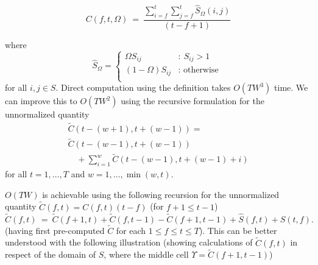 \documentclass[twocolumn]{article}
\begin{document}
	\begin{dmath*}
		C(f,t, \Omega) ~=~ \frac{ \sum_{i=f}^{t} \sum_{j=f}^{t} \hat S_\Omega(i,j) }{ (t-f+1) }
	\end{dmath*}
	
	where
	\begin{dmath*}
		\hat S_\Omega=	{ \left\{
			\begin{array}{ll}
				\Omega S_{ij}  & :  ~S_{ij} > 1   \\
				 \left( 1-\Omega \right) S_{ij} & : \mbox{~otherwise~}\\
			\end{array}
			\right.} 
	\end{dmath*} for all $i,j \in S.$ Direct computation using the definition takes $O(TW^3)$ time. We can improve this to $O(TW^2)$ using the recursive formulation for the unnormalized quantity 
	\begin{dmath*} 
		\begin{array}{ll}
		\tilde C( t-(w+1),t+(w-1) ) = \\
		 \tilde C( t-(w-1),t+(w-1) ) \\
		\hspace{1em} +  \sum_{i=1}^{w} \tilde C(t-(w-1),t+(w-1)+i)
		\end{array}
	\end{dmath*} for all $t=1,\ldots, T$ and $w=1,\ldots,\min(w,t)$.
	
	$O(TW)$ is achievable using the following recursion for the unnormalized quantity $\tilde
	C(f,t) = C(f,t)(t-f)$ (for $f+1 \le t-1$)
	\begin{dmath*}
		\tilde C(f,t) ~=~ \tilde C(f+1,t) + \tilde C(f,t-1) - \tilde C(f+1,t-1) + \hat S(f,t) + \hat S(t,f).
	\end{dmath*} (having first pre-computed $\tilde{C}$ for each $1 \le f \le t \le T$). This can be better understood with the following illustration (showing calculations of $\tilde{C}(f,t)$ in respect of the domain of $S$, where the middle cell $\Upsilon = \tilde{C}(f+1,t-1)$)
	
\end{document}
